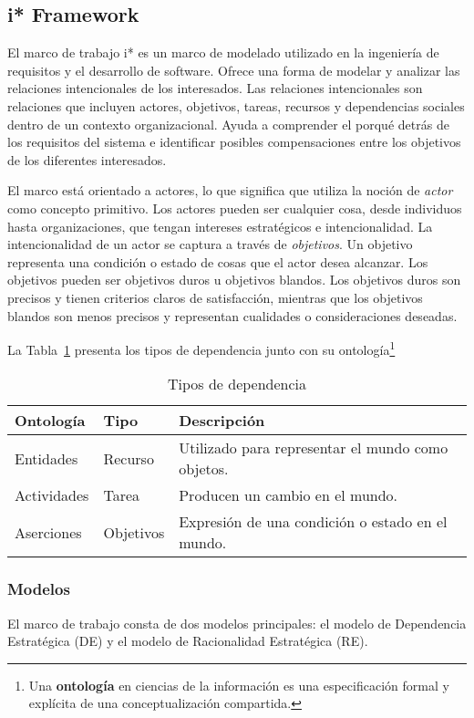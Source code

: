 \subsection{i* Framework}
El marco de trabajo i* \parencite{yu1995} es un marco de modelado utilizado en la ingeniería de requisitos y el desarrollo de software.
Ofrece una forma de modelar y analizar las relaciones intencionales de los interesados.
Las relaciones intencionales son relaciones que incluyen actores, objetivos, tareas, recursos y dependencias sociales dentro de un contexto organizacional.
Ayuda a comprender el porqué detrás de los requisitos del sistema e identificar posibles compensaciones entre los objetivos de los diferentes interesados.

El marco está orientado a actores, lo que significa que utiliza la noción de \textit{actor} como concepto primitivo.
Los actores pueden ser cualquier cosa, desde individuos hasta organizaciones, que tengan intereses estratégicos e intencionalidad.
La intencionalidad de un actor se captura a través de \textit{objetivos}.
Un objetivo representa una condición o estado de cosas que el actor desea alcanzar.
Los objetivos pueden ser objetivos duros u objetivos blandos.
Los objetivos duros son precisos y tienen criterios claros de satisfacción, mientras que los objetivos blandos son menos precisos y representan cualidades o consideraciones deseadas.

La Tabla~\ref{tab:istarDependencyTypes} presenta los tipos de dependencia junto con su ontología\footnote{Una \textbf{ontología} en ciencias de la información es una especificación formal y explícita de una conceptualización compartida.}
\begin{table}
	\caption{Tipos de dependencia}\label{tab:istarDependencyTypes}
	\begin{tabularx}{\textwidth}{@{} llX @{}}
		\toprule
		\textbf{Ontología} & \textbf{Tipo} & \textbf{Descripción} \\
		\midrule
		Entidades & Recurso & Utilizado para representar el mundo como objetos. \\
		Actividades & Tarea & Producen un cambio en el mundo. \\
		Aserciones & Objetivos & Expresión de una condición o estado en el mundo. \\
		\bottomrule
	\end{tabularx}
\end{table}

\subsubsection{Modelos}
El marco de trabajo consta de dos modelos principales: el modelo de Dependencia Estratégica (DE) y el modelo de Racionalidad Estratégica (RE).

